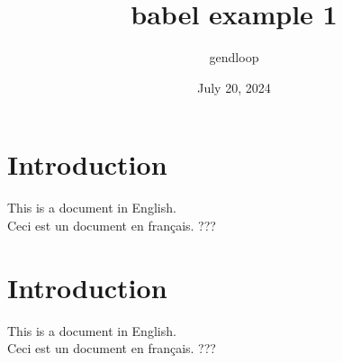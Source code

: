 \documentclass{article}
\title{babel example 1}
\author{gendloop}
\date{July 20, 2024}
\begin{document}
\maketitle

\section{Introduction}
This is a document in English. \\
Ceci est un document en français. ???

\section{Introduction}
This is a document in English. \\
Ceci est un document en français. ???
\end{document}
